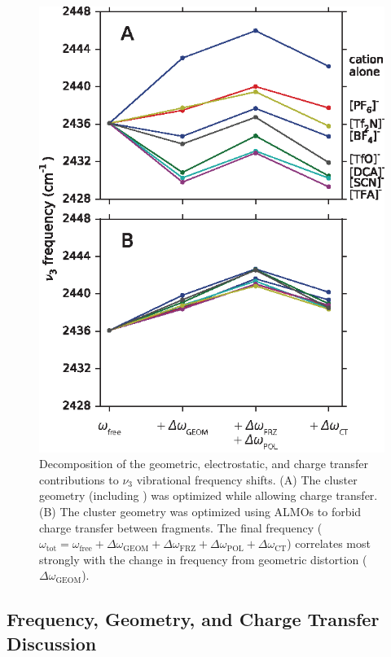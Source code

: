 \documentclass[%
  class = book,%
  crop = false,%
  float = true,%
  multi = true,%
  preview = false,%
]{standalone}
\begin{document}
{\begin{figure}
  \centering
  \includegraphics[scale=1.50]{fig4.eps}
  \caption[ALMO decomposition of \texorpdfstring{ \(\nu_3\)}{carbon dioxide asymmetric stretch} frequency]{\label{fig:decomposition}Decomposition of the geometric, electrostatic, and charge transfer contributions to  \(\nu_3\) vibrational frequency shifts. (A) The cluster geometry (including ) was optimized while allowing charge transfer. (B) The cluster geometry was optimized using ALMOs to forbid charge transfer between fragments. The final frequency (\(\omega_\mathrm{tot} = \omega_\mathrm{free} + \Delta \omega_\mathrm{GEOM} + \Delta \omega_\mathrm{FRZ} + \Delta \omega_\mathrm{POL} + \Delta \omega_\mathrm{CT}\)) correlates most strongly with the change in frequency from geometric distortion (\(\Delta \omega_\mathrm{GEOM}\)).}
\end{figure}

\subsection{Frequency, Geometry, and  Charge Transfer Discussion}
\label{sec:freq-geom_disc}

}
\end{document}
